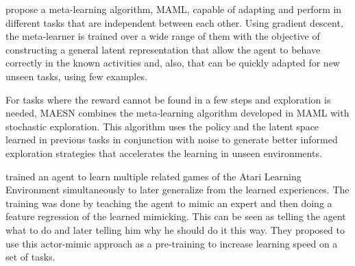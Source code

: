 \citet{MAML} propose a meta-learning algorithm, MAML, capable of adapting and perform in different tasks that are independent between each other. Using gradient descent, the meta-learner is trained over a wide range of them with the objective of constructing a general latent representation that allow the agent to behave correctly in the known activities and, also, that can be quickly adapted for new unseen tasks, using few examples.


For tasks where the reward cannot be found in a few steps and exploration is needed, MAESN \citep{MAESN} combines the meta-learning algorithm developed in MAML \citep{MAML} with stochastic exploration. This algorithm uses the policy and the latent space learned in previous tasks in conjunction with noise to generate better informed exploration strategies that accelerates the learning in unseen environments. 


\citet{parisotto2015actor} trained an agent to learn multiple related games of the Atari Learning Environment simultaneously to later generalize from the learned experiences. The training was done by teaching the agent to mimic an expert and then doing a feature regression of the learned mimicking. This can be seen as telling the agent what to do and later telling him why he should do it this way. They proposed to use this actor-mimic approach as a pre-training to increase learning speed on a set of tasks.


